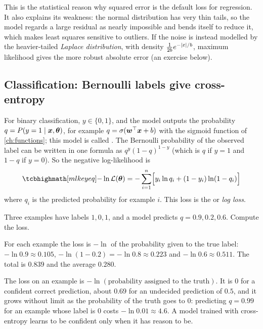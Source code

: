 This is the statistical reason why squared error is the default loss for
regression. It also explains its weakness: the normal distribution has very thin
tails, so the model regards a large residual as nearly impossible and bends
itself to reduce it, which makes least squares sensitive to outliers. If the
noise is instead modelled by the heavier-tailed \emph{Laplace distribution},
with density $\frac{1}{2b}e^{-\lvert\varepsilon\rvert/b}$, maximum likelihood gives the
more robust absolute error (an exercise below).

\subsection{Classification: Bernoulli labels give cross-entropy}

For binary classification, $y \in \{0, 1\}$, and the model outputs the
probability $q = P(y = 1 \mid \bm{x}, \bm{\theta})$, for example
$q = \sigma(\bm{w}^\top\bm{x} + b)$ with the sigmoid function of \cref{ch:functions};
this model is called . The Bernoulli probability of
the observed label can be written in one formula as $q^y(1 - q)^{1-y}$ (which is
$q$ if $y = 1$ and $1 - q$ if $y = 0$). So the negative log-likelihood is
\[
  \keyeq{-\ln\mathcal{L}(\vtheta)
  = -\sum_{i=1}^n\Bigl[y_i\ln q_i + (1 - y_i)\ln(1 - q_i)\Bigr]}
\]
where $q_i$ is the predicted probability for example $i$. This loss is the
 or \emph{log loss}.

\begin{example}\label{ex:bce}
Three examples have labels $1, 0, 1$, and a model predicts
$q = 0.9, 0.2, 0.6$. Compute the loss.

\sol For each example the loss is $-\ln$ of the probability given to the true
label: $-\ln0.9 \approx 0.105$, $-\ln(1 - 0.2) = -\ln0.8 \approx 0.223$ and
$-\ln0.6 \approx 0.511$. The total is $0.839$ and the average $0.280$.
\end{example}

\begin{intuition}
The loss on an example is $-\ln(\text{probability assigned to the truth})$. It
is $0$ for a confident correct prediction, about $0.69$ for an undecided
prediction of $0.5$, and it grows without limit as the probability of the truth
goes to $0$: predicting $q = 0.99$ for an example whose label is $0$ costs
$-\ln0.01 \approx 4.6$. A model trained with cross-entropy learns to be confident
only when it has reason to be.
\end{intuition}

